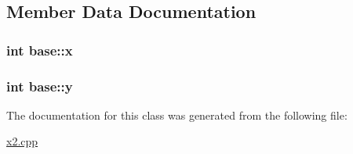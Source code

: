 \subsection{Member Data Documentation}
\subsubsection[{\texorpdfstring{x}{x}}]{\setlength{\rightskip}{0pt plus 5cm}int base\+::x\hspace{0.3cm}{\ttfamily [protected]}}\hypertarget{classbase_a2140518823404170403d2f7f4a0dec98}{}\label{classbase_a2140518823404170403d2f7f4a0dec98}
\subsubsection[{\texorpdfstring{y}{y}}]{\setlength{\rightskip}{0pt plus 5cm}int base\+::y\hspace{0.3cm}{\ttfamily [protected]}}\hypertarget{classbase_a717737c1e3bea49b6d8be8fea69df7af}{}\label{classbase_a717737c1e3bea49b6d8be8fea69df7af}


The documentation for this class was generated from the following file\+:\begin{DoxyCompactItemize}
\item 
\hyperlink{x2_8cpp}{x2.\+cpp}\end{DoxyCompactItemize}

